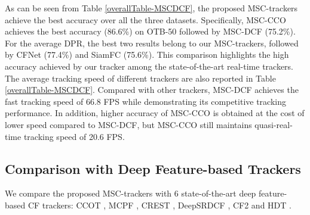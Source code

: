 \documentclass[runningheads]{llncs}
\begin{document}
As can be seen from Table \ref{overallTable-MSCDCF}, the proposed MSC-trackers achieve the best accuracy over all the three datasets. Specifically, MSC-CCO achieves the best accuracy (86.6\%) on OTB-50 followed by MSC-DCF (75.2\%). For the average DPR, the best two results belong to our MSC-trackers, followed by CFNet (77.4\%) and SiamFC (75.6\%). This comparison highlights the high accuracy achieved by our tracker among the state-of-the-art real-time trackers. The average tracking speed of different trackers are also reported in Table \ref{overallTable-MSCDCF}. Compared with other trackers, MSC-DCF achieves the fast tracking speed of 66.8 FPS while demonstrating its competitive tracking performance. In addition, higher accuracy of MSC-CCO is obtained at the cost of lower speed compared to MSC-DCF, but MSC-CCO still maintains quasi-real-time tracking speed of 20.6 FPS.







\subsection{Comparison with Deep Feature-based Trackers}
We compare the proposed MSC-trackers with 6 state-of-the-art deep feature-based CF trackers: CCOT \cite{CCOT}, MCPF \cite{MCPF}, CREST \cite{CREST}, DeepSRDCF \cite{DeepSRDCF}, CF2 \cite{HCF} and HDT \cite{HDT}. 
\end{document}

